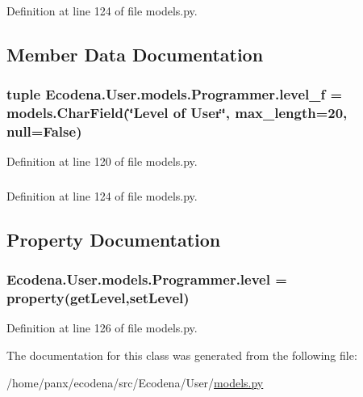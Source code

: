 Definition at line 124 of file models.py.



\subsection{Member Data Documentation}
\hypertarget{class_ecodena_1_1_user_1_1models_1_1_programmer_acac46c16e9e503624e807cefa8650a96}{
\subsubsection[{level\_\-f}]{\setlength{\rightskip}{0pt plus 5cm}tuple {\bf Ecodena.User.models.Programmer.level\_\-f} = models.CharField(\char`\"{}Level of User\char`\"{}, max\_\-length=20, null=False)}}
\label{d2/d55/class_ecodena_1_1_user_1_1models_1_1_programmer_acac46c16e9e503624e807cefa8650a96}


Definition at line 120 of file models.py.

\hypertarget{class_ecodena_1_1_user_1_1models_1_1_programmer_a9bcbccb27a1d7d20c8f294630ec7c3f3}{
\subsubsection[{level\_\-f}]{}}
\label{d2/d55/class_ecodena_1_1_user_1_1models_1_1_programmer_a9bcbccb27a1d7d20c8f294630ec7c3f3}


Definition at line 124 of file models.py.



\subsection{Property Documentation}
\hypertarget{class_ecodena_1_1_user_1_1models_1_1_programmer_a80f2ba5c6d6e335e9f52a22624e933bf}{
\subsubsection[{level}]{\setlength{\rightskip}{0pt plus 5cm}Ecodena.User.models.Programmer.level = property(getLevel,setLevel)}}
\label{d2/d55/class_ecodena_1_1_user_1_1models_1_1_programmer_a80f2ba5c6d6e335e9f52a22624e933bf}


Definition at line 126 of file models.py.



The documentation for this class was generated from the following file:\begin{DoxyCompactItemize}
\item 
/home/panx/ecodena/src/Ecodena/User/\hyperlink{_user_2models_8py}{models.py}\end{DoxyCompactItemize}
